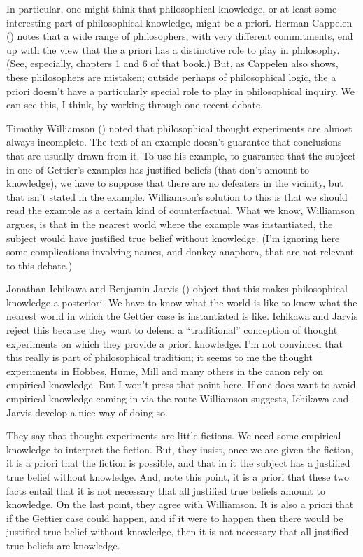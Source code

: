 \documentclass[
  10pt,
  letterpaper,
  DIV=11,
  numbers=noendperiod,
  twoside]{scrartcl}
\begin{document}
In particular, one might think that philosophical knowledge, or at least
some interesting part of philosophical knowledge, might be a priori.
Herman Cappelen () notes that a wide
range of philosophers, with very different commitments, end up with the
view that the a priori has a distinctive role to play in philosophy.
(See, especially, chapters 1 and 6 of that book.) But, as Cappelen also
shows, these philosophers are mistaken; outside perhaps of philosophical
logic, the a priori doesn't have a particularly special role to play in
philosophical inquiry. We can see this, I think, by working through one
recent debate.

Timothy Williamson () noted
that philosophical thought experiments are almost always incomplete. The
text of an example doesn't guarantee that conclusions that are usually
drawn from it. To use his example, to guarantee that the subject in one
of Gettier's examples has justified beliefs (that don't amount to
knowledge), we have to suppose that there are no defeaters in the
vicinity, but that isn't stated in the example. Williamson's solution to
this is that we should read the example as a certain kind of
counterfactual. What we know, Williamson argues, is that in the nearest
world where the example was instantiated, the subject would have
justified true belief without knowledge. (I'm ignoring here some
complications involving names, and donkey anaphora, that are not
relevant to this debate.)

Jonathan Ichikawa and Benjamin Jarvis
() object that this makes
philosophical knowledge a posteriori. We have to know what the world is
like to know what the nearest world in which the Gettier case is
instantiated is like. Ichikawa and Jarvis reject this because they want
to defend a ``traditional'' conception of thought experiments on which
they provide a priori knowledge. I'm not convinced that this really is
part of philosophical tradition; it seems to me the thought experiments
in Hobbes, Hume, Mill and many others in the canon rely on empirical
knowledge. But I won't press that point here. If one does want to avoid
empirical knowledge coming in via the route Williamson suggests,
Ichikawa and Jarvis develop a nice way of doing so.

They say that thought experiments are little fictions. We need some
empirical knowledge to interpret the fiction. But, they insist, once we
are given the fiction, it is a priori that the fiction is possible, and
that in it the subject has a justified true belief without knowledge.
And, note this point, it is a priori that these two facts entail that it
is not necessary that all justified true beliefs amount to knowledge. On
the last point, they agree with Williamson. It is also a priori that if
the Gettier case could happen, and if it were to happen then there would
be justified true belief without knowledge, then it is not necessary
that all justified true beliefs are knowledge.
\end{document}
